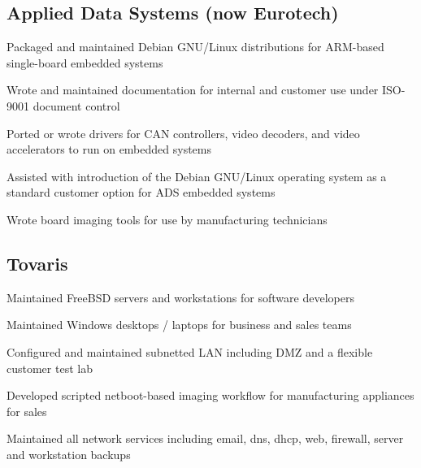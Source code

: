 \documentclass[letterpaper]{deedy-resume}
\begin{document}
\begin{minipage}[t]{0.69\textwidth}
\vspace{6pt}
\subsection{Applied Data Systems (now Eurotech)}
\vspace{2pt}

\begin{tightitemize}
	\item Packaged and maintained Debian GNU/Linux distributions for ARM-based single-board embedded systems
	\item Wrote and maintained documentation for internal and customer use under ISO-9001 document control
\end{tightitemize}
\end{minipage}
\newpage
\begin{tightitemize}
	\item Ported or wrote drivers for CAN controllers, video decoders, and video accelerators to run on embedded systems
	\item Assisted with introduction of the Debian GNU/Linux operating system as a	standard customer option for ADS embedded systems
	\item Wrote board imaging tools for use by manufacturing technicians
\end{tightitemize}

\vspace{6pt}
\subsection{Tovaris}
\vspace{2pt}

\begin{tightitemize}
	\item Maintained FreeBSD servers and workstations for software developers
	\item Maintained Windows desktops / laptops for business and sales teams
	\item Configured and maintained subnetted LAN including DMZ and a flexible customer test lab
	\item Developed scripted netboot-based imaging workflow for manufacturing appliances for sales
	\item Maintained all network services including email, dns, dhcp, web, firewall, server and workstation backups
\end{tightitemize}
\vspace{20pt}
\end{document}
